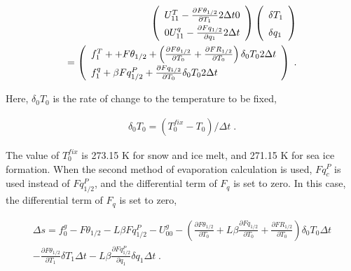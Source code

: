 \begin{eqnarray}
 \renewcommand{\arraystretch}{1.5}
  \left( \begin{array}{cc}
      U_{11}^T - \frac{\partial{F\theta_{1/2}}}{\partial {T_1}} 2 \Delta t
      0 \\
      0
      U_{11}^q - \frac{\partial{Fq_{1/2}}}{\partial {q_1}} 2 \Delta t \\
  \end{array} \right)
  \left( \begin{array}{l}
      \delta T_1 \\ \delta q_1 \\
  \end{array} \right)  \\
=
  \left( \begin{array}{l}
      f_1^T + + F\theta_{1/2}
      + \left( \frac{\partial{F\theta_{1/2}}}{\partial {T_0}}
                    + \frac{\partial{FR_{1/2}}}{\partial {T_0}} \right) \delta_0 T_0 2 \Delta t \\
      f_1^q +  \beta Fq^P_{1/2}
      + \frac{\partial{Fq_{1/2}}}{\partial {T_0}} \delta_0 T_0 2 \Delta t \\
  \end{array} \right) \; .
\end{eqnarray}

Here, \(\delta_0 T_0\) is the rate of change to the temperature to be fixed,

\begin{eqnarray}
   \delta_0 T_0 = ( T_0^{fix} - T_0 ) / \Delta t \; .
\end{eqnarray}

The value of \(T_0^{fix}\) is 273.15 K for snow and ice melt, and 271.15 K for sea ice formation. When the second method of evaporation calculation is used, \(Fq^P_c\) is used instead of
\(Fq^P_{1/2}\), and the differential term of \(F_q\) is set to zero. In this case, the differential term of \(F_q\) is set to zero,

\begin{eqnarray}
\Delta s  =  f_0^g - F\theta_{1/2} - L \beta Fq^P_{1/2} - U_{00}^g
          -  \left(\frac{\partial{F\theta_{1/2}}}{\partial {T_0}}
                + L \beta \frac{\partial{Fq_{1/2}}}{\partial {T_0}}
                + \frac{\partial{FR_{1/2}}}{\partial {T_0}} \right) \delta_0 T_0 \Delta t
                 \\
          -  \frac{\partial{F\theta_{1/2}}}{\partial {T_1}} \delta T_1 \Delta t
                - L \beta \frac{\partial{Fq^P_{1/2}}}{\partial {q_1}} \delta q_1 \Delta t \; .
\end{eqnarray}

